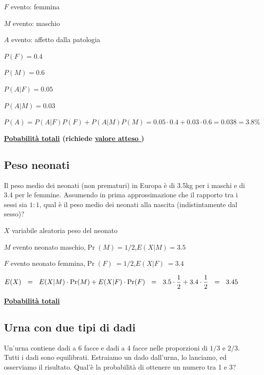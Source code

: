 \documentclass[11pt,openany]{book}
\begin{document}
$F$ evento: femmina

$M$ evento: maschio

$A$ evento: affetto dalla patologia

$P(F)=0.4$

$P(M)=0.6$

$P(A|F)=0.05$

$P(A|M)=0.03$

$P(A)=P(A|F)P(F)+P(A|M)P(M)=0.05\cdot0.4+0.03\cdot0.6=0.038=3.8\%$


\clearpage
\hfill\textbf{{\color{brown}\hyperref[TeoremaProbabilitaTotaliMedia]{Pobabilità totali} \faShare} (richiede \hyperref[ValoreAtteso]{valore atteso \faShare})}
\subsection{Peso neonati}
\label{Neonati_totali}

Il peso medio dei neonati (non prematuri) in Europa è di 3.5kg per i maschi e di 3.4 per le femmine. Assumendo in prima approssimazione che il rapporto tra i sessi sia $1:1$, qual è il peso medio dei neonati alla nascita (indistintamente dal sesso)?

$X$ variabile aleatoria peso del neonato

$M$ evento neonato maschio,\quad $\Pr(M)=1/2$,\quad $E(X|M)=3.5$

$F$ evento neonato femmina,\quad $\Pr(F)\ =1/2$,\quad $E(X|F)\ =3.4$


$E(X)\medrel{=}E(X|M)\cdot\Pr(M)+ E(X|F)\cdot\Pr(F)\medrel{=}3.5\cdot\dfrac12 + 3.4\cdot\dfrac12\medrel{=}3.45$


\clearpage
\hfill\textbf{{\color{brown}\hyperref[TeoremaProbabilitaTotali]{Pobabilità totali} \faShare}}
\subsection{Urna con due tipi di dadi}
\label{dadi_diversi}

Un'urna contiene dadi a 6 facce e dadi a 4 facce nelle proporzioni di $1/3$ e $2/3$.
Tutti i dadi sono equilibrati.
Estraiamo un dado dall'urna, lo lanciamo, ed osserviamo il risultato.
Qual'è la probabilità di ottenere un numero tra 1 e 3?
\end{document}
